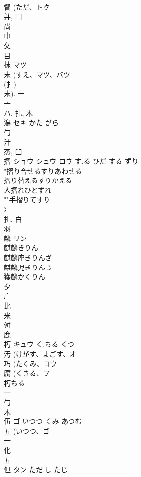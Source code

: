 \documentclass[8pt]{extreport}
\begin{document}
\begin{CJK}{UTF8}{min}
\\	督 (ただ、トク 
\\	并, 冂 
\\	尚 
\\	巾 
\\	攵 
\\	目 
\\	抹	マツ		
\\	末 (すえ、マツ、バツ 
\\	(扌) 
\\	末).			一 
\\	亠 
\\	ハ, 扎, 木 
\\	潟	セキ	かた がら	
\\	勹 
\\	汁 
\\	杰, 臼 
\\	摺	ショウ シュウ ロウ	す.る ひだ する ずり	
\\	"摺り合せるすりあわせる
\\	摺り替えるすりかえる
\\	人摺れひとずれ
\\	""手摺りてすり
\\	冫 
\\	扎, 白 
\\	羽 
\\	麟	リン		
\\	麒麟きりん 
\\	麒麟座きりんざ 
\\	麒麟児きりんじ 
\\	獲麟かくりん 
\\	夕 
\\	广 
\\	比 
\\	米 
\\	舛 
\\	鹿 
\\	朽	キュウ	く.ちる くつ	
\\	汚 (けがす、よごす、オ 
\\	巧 (たくみ、コウ 
\\	腐 (くさる、フ 
\\	朽ちる 
\\	一 
\\	勹 
\\	木 
\\	伍	ゴ	いつつ くみ あつむ	
\\	五 (いつつ、ゴ 
\\	一 
\\	化 
\\	五 
\\	但	タン	ただ.し たじ	

\end{CJK}
\end{document}
